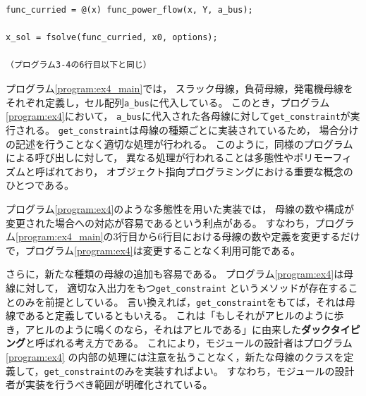 \documentclass[tombow,dvipdfmx]{corona-a5-1.1}
\begin{document}
\begin{例}[多態性を用いた潮流計算の実装例]
\begin{PROGRAMA}[count,title={main\_ex4.m}]
\begin{verbatim}
func_curried = @(x) func_power_flow(x, Y, a_bus);

x_sol = fsolve(func_curried, x0, options);

（プログラム3-4の6行目以下と同じ）
\end{verbatim}
\end{PROGRAMA}
プログラム\nobreak\ref{program:ex4_main}では，
スラック母線，負荷母線，発電機母線を
それぞれ定義し，セル配列\verb|a_bus|に代入している。
このとき，プログラム\nobreak\ref{program:ex4}において，
\verb|a_bus|に代入された各母線に対して\verb|get_constraint|が実行される。
\verb|get_constraint|は母線の種類ごとに実装されているため，
場合分けの記述を行うことなく適切な処理が行われる。
このように，同様のプログラムによる呼び出しに対して，
異なる処理が行われることは{多態性}や{ポリモーフィズム}と呼ばれており，
オブジェクト指向プログラミングにおける重要な概念のひとつである。

プログラム\nobreak\ref{program:ex4}のような多態性を用いた実装では，
母線の数や構成が変更された場合への対応が容易であるという利点がある。
すなわち，プログラム\nobreak\ref{program:ex4_main}の3行目から6行目における母線の数や定義を変更するだけで，プログラム\nobreak\ref{program:ex4}は変更することなく利用可能である。

さらに，新たな種類の母線の追加も容易である。
プログラム\nobreak\ref{program:ex4}は母線に対して，
適切な入出力をもつ\verb|get_constraint|
というメソッドが存在することのみを前提としている。
言い換えれば，\verb|get_constraint|をもてば，それは母線であると定義しているともいえる。
これは「もしそれがアヒルのように歩き，アヒルのように鳴くのなら，それはアヒルである」に由来した\textbf{ダックタイピング}と呼ばれる考え方である。
これにより，モジュールの設計者はプログラム\nobreak\ref{program:ex4}
の内部の処理には注意を払うことなく，新たな母線のクラスを定義して，\verb|get_constraint|のみを実装すればよい。
すなわち，モジュールの設計者が実装を行うべき範囲が明確化されている。

\end{例}
\end{document}
